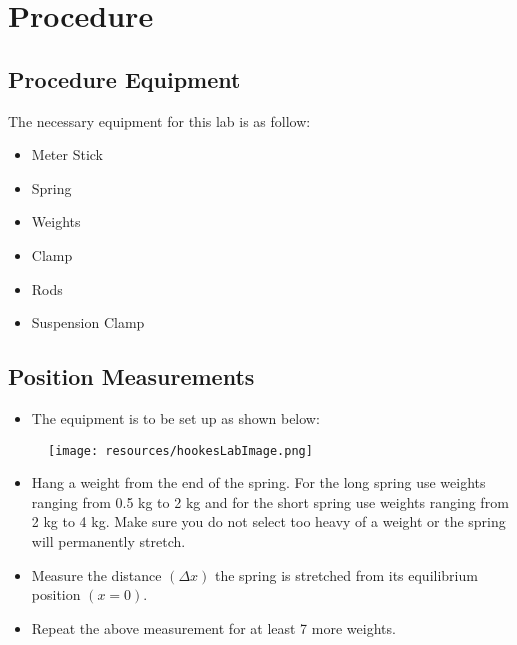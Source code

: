 \chapter{Procedure}

\section{Procedure Equipment}

The necessary equipment for this lab is as follow: 
\begin{itemize}
  \item Meter Stick
  \item Spring
  \item Weights 
  \item Clamp
  \item Rods
  \item Suspension Clamp
\end{itemize}

\section{Position Measurements}

\begin{itemize}
  \item The equipment is to be set up as shown below:
\end{itemize}

\begin{figure}[h!]
  \centerline{\texttt{[image: resources/hookesLabImage.png]}}
\end{figure}

\begin{itemize}
  \item Hang a weight from the end of the spring. For the long spring use weights ranging
        from 0.5 kg to 2 kg and for the short spring use weights ranging from 2 kg to 4 
        kg. Make sure you do not select too heavy of a weight or the spring will 
        permanently stretch.
  \item Measure the distance $(\Delta x)$ the spring is stretched from its equilibrium
        position $(x = 0)$.
  \item Repeat the above measurement for at least 7 more weights.
\end{itemize}
\restoregeometry